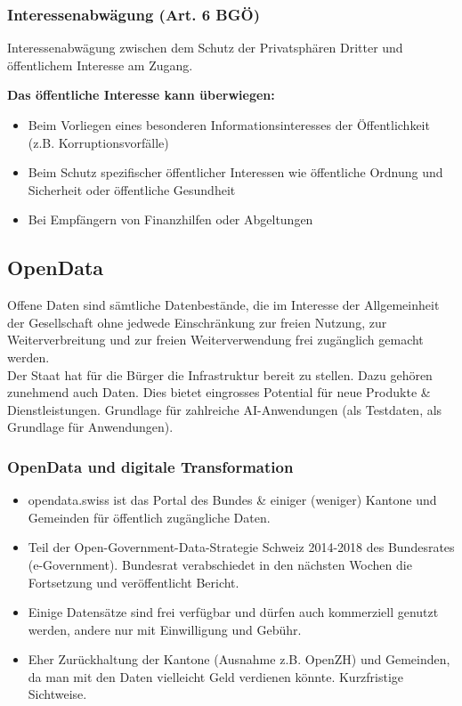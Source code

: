 \subsubsection{Interessenabwägung (Art. 6 BGÖ)}
Interessenabwägung zwischen dem Schutz der Privatsphären Dritter und
öffentlichem Interesse am Zugang.

\textbf{Das öffentliche Interesse kann überwiegen:}
\begin{itemize}
	\tightlist
	\item Beim Vorliegen eines besonderen Informationsinteresses der Öffentlichkeit
	(z.B. Korruptionsvorfälle)
	\item Beim Schutz spezifischer öffentlicher Interessen wie öffentliche Ordnung
	und	Sicherheit oder öffentliche Gesundheit
	\item Bei Empfängern von Finanzhilfen oder Abgeltungen
\end{itemize}

\subsection{OpenData}
Offene Daten sind sämtliche Datenbestände, die im Interesse der Allgemeinheit
der Gesellschaft ohne jedwede Einschränkung zur freien Nutzung, zur
Weiterverbreitung und zur freien Weiterverwendung frei zugänglich gemacht
werden.\\

Der Staat hat für die Bürger die Infrastruktur bereit zu stellen. Dazu
gehören zunehmend auch Daten. Dies bietet eingrosses Potential für neue Produkte
\& Dienstleistungen. Grundlage für zahlreiche AI-Anwendungen (als Testdaten,
als Grundlage für Anwendungen).

\subsubsection{OpenData und digitale Transformation}

\begin{itemize}
	\tightlist
	\item opendata.swiss ist das Portal des Bundes \& einiger (weniger) Kantone und
	Gemeinden für öffentlich zugängliche Daten.
	\item Teil der Open-Government-Data-Strategie Schweiz 2014-2018 des
	Bundesrates (e-Government). Bundesrat verabschiedet in den nächsten
	Wochen die Fortsetzung und veröffentlicht Bericht.
	\item Einige Datensätze sind frei verfügbar und dürfen auch kommerziell genutzt
	werden, andere nur mit Einwilligung und Gebühr.
	\item Eher Zurückhaltung der Kantone (Ausnahme z.B. OpenZH) und Gemeinden, da
	man mit den Daten vielleicht Geld verdienen könnte. Kurzfristige Sichtweise.
\end{itemize}